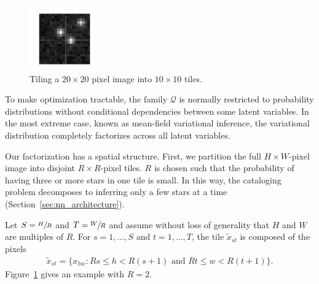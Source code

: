 
\begin{figure}[tb]
    \centering
    \includegraphics[width = 0.25\textwidth]{figures/vi_figures/example_tiled_10.png}
    \caption{Tiling a $20 \times 20$ pixel image into $10 \times 10$ tiles.}
    \label{fig:ex_tiles}
\end{figure}

To make optimization tractable, the family $\mathcal{Q}$ is normally restricted to probability distributions
without conditional dependencies between some latent variables. In the most extreme case, known as mean-field variational inference, the variational distribution completely factorizes across all latent variables.

Our factorization has a spatial structure.
First, we partition the full $H \times W$-pixel image into disjoint $R \times R$-pixel tiles.
$R$ is chosen such that the probability of having three or more stars in one tile is small.
In this way, the cataloging problem decomposes to inferring only a few stars at a time (Section~\ref{sec:nn_architecture}).


Let $S = \sfrac{H}{R}$ and $T = \sfrac{W}{R}$ and assume without loss of generality that $H$ and $W$ are multiples of $R$.
For $s = 1, ..., S$ and $t = 1, ..., T$,
the tile $\tilde x_{st}$ is composed of the pixels
\begin{align}
    \tilde x_{st} = \{x_{hw} : Rs \leq h < R(s+1) \text{ and } Rt \leq w < R(t+1)\}.
    \label{eq:tiles}
\end{align}
Figure~\ref{fig:ex_tiles} gives an example with $R = 2$.

